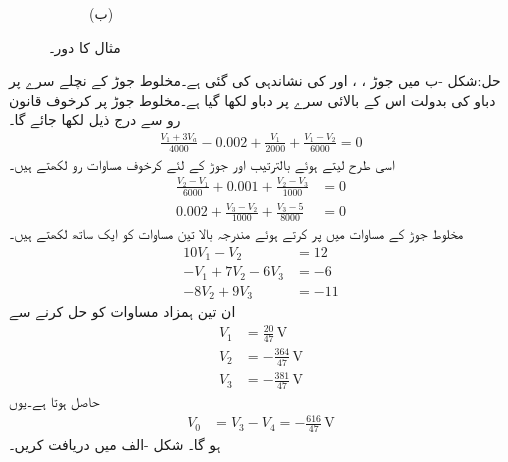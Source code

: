 \begin{figure}
\begin{subfigure}{1\textwidth}
%
\caption*{(ب)}
\end{subfigure}
\caption{مثال  کا دور۔}
\label{شکل_جوڑ_تابع_منبع_مخلوط_جوڑ_الف}
\end{figure}

حل:شکل -ب میں جوڑ ، ،   اور  کی نشاندہی کی گئی ہے۔مخلوط جوڑ کے نچلے سرے پر  دباو کی بدولت اس کے بالائی سرے پر  دباو لکھا گیا ہے۔مخلوط جوڑ پر کرخوف قانون رو سے درج ذیل لکھا جائے گا۔
\begin{align*}
\frac{V_1+3V_a}{4000}-0.002+\frac{V_1}{2000}+\frac{V_1-V_2}{6000}=0
\end{align*}
اسی طرح  لیتے ہوئے  بالترتیب  اور   جوڑ کے لئے کرخوف مساوات رو لکھتے ہیں۔
\begin{align*}
\frac{V_2-V_1}{6000}+0.001+\frac{V_2-V_3}{1000}&=0\\
0.002+\frac{V_3-V_2}{1000}+\frac{V_3-5}{8000}&=0
\end{align*}
مخلوط جوڑ کے مساوات میں  پر کرتے ہوئے مندرجہ بالا تین مساوات کو ایک ساتھ لکھتے ہیں۔
\begin{align*}
10 V_1-V_2&=12\\
-V_1+7V_2-6V_3&=-6\\
-8V_2+9V_3&=-11
\end{align*}
ان تین ہمزاد مساوات کو حل کرنے سے
\begin{align*}
V_1&=\frac{20}{47} \, \si{\volt}\\
V_2&=-\frac{364}{47} \, \si{\volt}\\
V_3&=-\frac{381}{47} \, \si{\volt}
\end{align*}
حاصل ہوتا ہے۔یوں
\begin{align*}
V_0&=V_3-V_4=-\frac{616}{47} \, \si{\volt}
\end{align*}
ہو گا۔
شکل -الف میں  دریافت کریں۔

